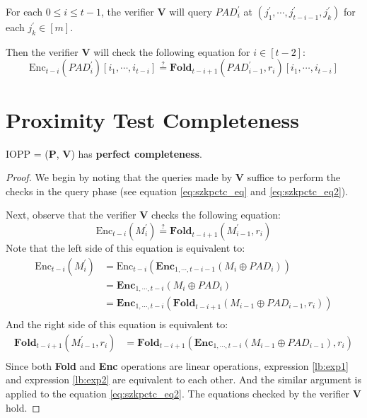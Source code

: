 \begin{enumerate}
    For each $0 \le i \le t-1$, 
    the verifier $\textbf{V}$ will query $PAD_{i}^{\prime}$ at $(j_1^\prime, \cdots, j_{t-i-1}^\prime, j_k^\prime)$ for each $j_k^\prime \in [m]$. 
    
    Then the verifier $\textbf{V}$ will check the following equation for $i \in [t-2]$:
\begin{equation}
\label{eq:szkpctc_eq2}
    \text{Enc}_{t-i}(PAD_i^\prime)[i_1, \cdots, i_{t-i}] \stackrel{?}{=} \textbf{Fold}_{t-i+1}(PAD_{i-1}^\prime, r_i) [i_1, \cdots, i_{t-i}]
\end{equation}




\end{enumerate}

\section{Proximity Test Completeness}

\begin{lemma}
\label{lemma:szkpctcc}

IOPP = ($\textbf{P}$, $\textbf{V}$) has \textbf{perfect completeness}.

\end{lemma}
\begin{proof}
We begin by noting that the queries made by $\textbf{V}$ suffice to perform the checks in the query phase (see equation \ref{eq:szkpctc_eq} and \ref{eq:szkpctc_eq2}).

Next, observe that the verifier $\textbf{V}$ checks the following equation:
$$
    \text{Enc}_{t-i}(M_i^\prime) \stackrel{?}{=} 
    \textbf{Fold}_{t-i+1}(M_{i-1}^\prime, r_i) 
$$
Note that the left side of this equation is equivalent to:
\begin{align}
\text{Enc}_{t-i}(M_i^\prime) \nonumber
&= \text{Enc}_{t-i}(\textbf{Enc}_{1, \cdots, t- i - 1}(M_i \oplus PAD_i)) \nonumber \\
&= \textbf{Enc}_{1, \cdots, t-i}(M_i \oplus PAD_i) \nonumber \\
&= \textbf{Enc}_{1, \cdots, t-i}(\textbf{Fold}_{t-i+1}(M_{i-1} \oplus PAD_{i-1}, r_i)) \label{lb:exp1} \\
\end{align}
And the right side of this equation is equivalent to:
\begin{align}
\textbf{Fold}_{t-i+1}(M_{i-1}^\prime, r_i) 
&= \textbf{Fold}_{t-i+1}(\textbf{Enc}_{1, \cdots, t- i}(M_{i-1} \oplus PAD_{i-1}), r_i) \label{lb:exp2} \\
\end{align}
Since both \textbf{Fold} and \textbf{Enc} operations are linear operations, expression \ref{lb:exp1} and  expression \ref{lb:exp2} are equivalent to each other. And the similar argument is applied to the equation \ref{eq:szkpctc_eq2}.
The equations checked by the verifier $\textbf{V}$ hold.

\end{proof}




